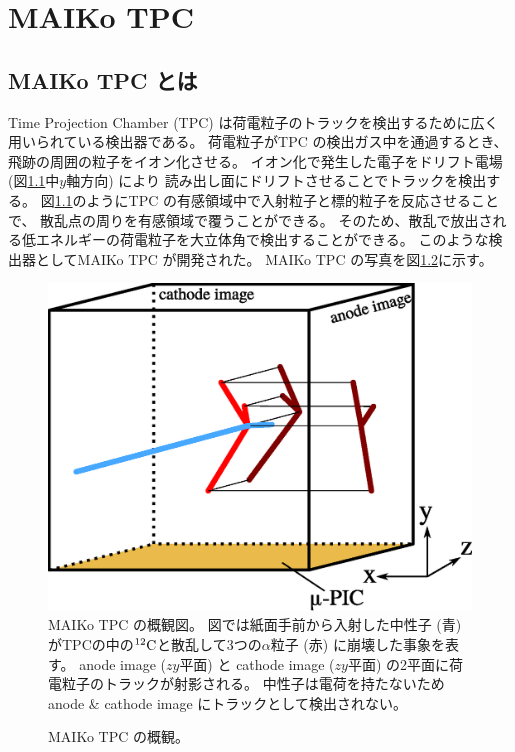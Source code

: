 \documentclass[../master]{subfiles}
\begin{document}
\chapter{MAIKo TPC}
\section{MAIKo TPC とは}
Time Projection Chamber (TPC) は荷電粒子のトラックを検出するために広く用いられている検出器である。
荷電粒子がTPC の検出ガス中を通過するとき、飛跡の周囲の粒子をイオン化させる。
イオン化で発生した電子をドリフト電場 (図\ref{fig::MAIKo_view}中$y$軸方向) により
読み出し面にドリフトさせることでトラックを検出する。
図\ref{fig::MAIKo_view}のようにTPC の有感領域中で入射粒子と標的粒子を反応させることで、
散乱点の周りを有感領域で覆うことができる。
そのため、散乱で放出される低エネルギーの荷電粒子を大立体角で検出することができる。
このような検出器としてMAIKo TPC が開発された。
MAIKo TPC の写真を図\ref{pic::MAIKo}に示す。
\begin{figure}
  \centering
  \includegraphics[clip, width=0.7\columnwidth]{MAIKo2.eps}
  \caption[MAIKo TPC の概観図。]{MAIKo TPC の概観図。
    図では紙面手前から入射した中性子 (青) がTPCの中の${}^{12}{\rm C}$と散乱して3つの$\alpha$粒子 (赤) に崩壊した事象を表す。
    anode image ($zy$平面) と cathode image ($zy$平面) の2平面に荷電粒子のトラックが射影される。
    中性子は電荷を持たないためanode \& cathode image にトラックとして検出されない。
  }
  \label{fig::MAIKo_view}
\end{figure}
\begin{figure}
  \centering
  \caption[MAIKo TPC の概観。]{MAIKo TPC の概観。}
  \label{pic::MAIKo}
\end{figure}
\end{document}
